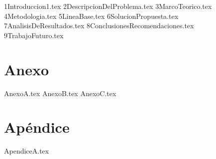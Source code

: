 \documentclass[12pt,letterpaper,oneside]{book}
\newcommand{\capitulo}[1]{{#1.tex}}
\newcommand{\apendice}[1]{{#1.tex}}
\newcommand{\anexo}[1]{{#1.tex}}
\begin{document}
\frontmatter

\clearpage
\thispagestyle{empty}

\clearpage
\thispagestyle{empty}
\tableofcontents
\thispagestyle{empty}
\clearpage

\setcounter{page}{1}
\listoffigures
{}
\clearpage
\listoftables
{}
\clearpage

\mainmatter
\capitulo{1Introduccion1}
\capitulo{2DescripcionDelProblema}
\capitulo{3MarcoTeorico}
\capitulo{4Metodologia}
\capitulo{5LineaBase}
\capitulo{6SolucionPropuesta}
\capitulo{7AnalisisDeResultados}
\capitulo{8ConclusionesRecomendaciones}
\capitulo{9TrabajoFuturo}
\lipsum[1]
\chapter*{Anexo}
\renewcommand{\thesection}{\Alph{section}}
\anexo{AnexoA}
\anexo{AnexoB}
\anexo{AnexoC}
\appendix
{}
\chapter*{Apéndice}
\apendice{ApendiceA}
\backmatter


\end{document}
